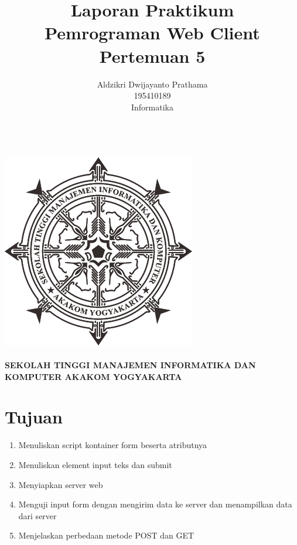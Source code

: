 \documentclass[a4paper,12pt]{article}
\begin{document}
\title{ {\Large Laporan Praktikum}\\ Pemrograman Web Client\\{\Large Pertemuan 5}}

\author{Aldzikri Dwijayanto Prathama 
	\\195410189
	\\Informatika}
\makeatletter
\begin{titlepage}
	\begin{center}
		{\huge \bfseries \@title }\\[14ex]
		\includegraphics[scale=.8]{logo}\\[4ex]
		{\large \@author}\\[12ex]
		{\large \bfseries {SEKOLAH TINGGI MANAJEMEN INFORMATIKA DAN KOMPUTER
				AKAKOM YOGYAKARTA}}
	\end{center}


\end{titlepage}
\makeatother
\newpage
\tableofcontents
\newpage
\section{Tujuan}
\begin{enumerate}
    \item Menuliskan script kontainer form beserta atributnya
    \item Menuliskan element input teks dan submit
    \item Menyiapkan server web
    \item Menguji input form dengan mengirim data ke server dan menampilkan data dari server
    \item Menjelaskan perbedaan metode POST dan GET
\end{enumerate}
\end{document}
